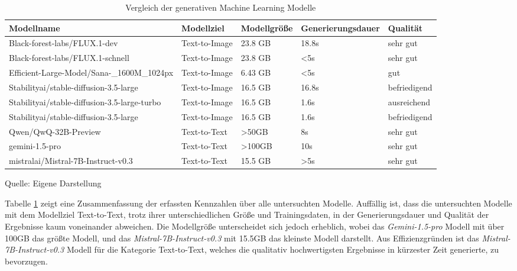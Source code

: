 \begin{table}[h]
  \begin{tabular}{|p{3cm}|p{3cm}|p{2cm}|p{2cm}|p{3cm}|}
      \hline
      \textbf{Modellname} & \textbf{Modellziel} & \textbf{Modellgröße} & \textbf{Generierungsdauer} & \textbf{Qualität}\\ \hline
      {Black-forest-labs/FLUX.1-dev} & Text-to-Image & 23.8 GB & 18.8s & sehr gut\\ \hline
      {Black-forest-labs/FLUX.1-schnell} & Text-to-Image & 23.8 GB & \textless 5s & sehr gut\\ \hline
      {Efficient-Large-Model/Sana-\_1600M\_1024px} & Text-to-Image & 6.43 GB & \textless 5s & gut\\ \hline
      {Stabilityai/stable-diffusion-3.5-large} & Text-to-Image & 16.5 GB & 16.8s & befriedigend\\ \hline
      {Stabilityai/stable-diffusion-3.5-large-turbo} & Text-to-Image & 16.5 GB & 1.6s & ausreichend\\ \hline
      {Stabilityai/stable-diffusion-3.5-large} & Text-to-Image & 16.5 GB & 1.6s& befriedigend\\ \hline
      {Qwen/QwQ-32B-Preview} & Text-to-Text & \textgreater 50GB & 8s & sehr gut\\ \hline
      {gemini-1.5-pro} & Text-to-Text & \textgreater 100GB & 10s & sehr gut\\ \hline
      {mistralai/Mistral-7B-Instruct-v0.3} & Text-to-Text & 15.5 GB & \textgreater5s & sehr gut\\ \hline
  \end{tabular}
  \caption{Vergleich der generativen Machine Learning Modelle}\label{tab:table_modellvergleich}
  \raggedright Quelle: Eigene Darstellung
\end{table}

Tabelle \ref{tab:table_modellvergleich} zeigt eine Zusammenfassung der erfassten Kennzahlen über alle untersuchten Modelle.
Auffällig ist, dass die untersuchten Modelle mit dem Modellziel Text-to-Text, trotz ihrer unterschiedlichen Größe und Trainingsdaten, in der Generierungsdauer und Qualität der Ergebnisse kaum voneinander abweichen.
Die Modellgröße unterscheidet sich jedoch erheblich, wobei das \textit{Gemini-1.5-pro} Modell mit über 100GB das größte Modell, und das \textit{Mistral-7B-Instruct-v0.3} mit 15.5GB das kleinste Modell darstellt.
Aus Effizienzgründen ist das \textit{Mistral-7B-Instruct-v0.3} Modell für die Kategorie Text-to-Text, welches die qualitativ hochwertigsten Ergebnisse in kürzester Zeit generierte, zu bevorzugen.

